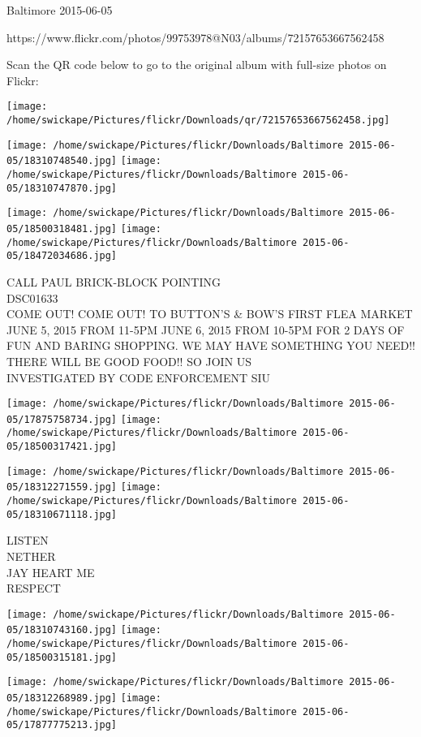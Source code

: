 \documentclass[10pt,letterpaper]{article}
\begin{document}
Baltimore 2015-06-05

https://www.flickr.com/photos/99753978@N03/albums/72157653667562458

Scan the QR code below to go to the original album with full-size photos on Flickr:

\texttt{[image: /home/swickape/Pictures/flickr/Downloads/qr/72157653667562458.jpg]}
\pagebreak

\texttt{[image: /home/swickape/Pictures/flickr/Downloads/Baltimore 2015-06-05/18310748540.jpg]}
\texttt{[image: /home/swickape/Pictures/flickr/Downloads/Baltimore 2015-06-05/18310747870.jpg]}

\texttt{[image: /home/swickape/Pictures/flickr/Downloads/Baltimore 2015-06-05/18500318481.jpg]}
\texttt{[image: /home/swickape/Pictures/flickr/Downloads/Baltimore 2015-06-05/18472034686.jpg]}

CALL PAUL BRICK{-}BLOCK POINTING\\
DSC01633\\
COME OUT!  COME OUT!  TO BUTTON'S \& BOW'S FIRST FLEA MARKET JUNE 5, 2015 FROM 11{-}5PM JUNE 6, 2015 FROM 10{-}5PM FOR 2 DAYS OF FUN AND BARING SHOPPING.  WE MAY HAVE SOMETHING YOU NEED!! THERE WILL BE GOOD FOOD!! SO JOIN US\\
INVESTIGATED BY CODE ENFORCEMENT SIU
\pagebreak

\texttt{[image: /home/swickape/Pictures/flickr/Downloads/Baltimore 2015-06-05/17875758734.jpg]}
\texttt{[image: /home/swickape/Pictures/flickr/Downloads/Baltimore 2015-06-05/18500317421.jpg]}

\texttt{[image: /home/swickape/Pictures/flickr/Downloads/Baltimore 2015-06-05/18312271559.jpg]}
\texttt{[image: /home/swickape/Pictures/flickr/Downloads/Baltimore 2015-06-05/18310671118.jpg]}

LISTEN\\
NETHER\\
JAY HEART ME\\
RESPECT
\pagebreak

\texttt{[image: /home/swickape/Pictures/flickr/Downloads/Baltimore 2015-06-05/18310743160.jpg]}
\texttt{[image: /home/swickape/Pictures/flickr/Downloads/Baltimore 2015-06-05/18500315181.jpg]}

\texttt{[image: /home/swickape/Pictures/flickr/Downloads/Baltimore 2015-06-05/18312268989.jpg]}
\texttt{[image: /home/swickape/Pictures/flickr/Downloads/Baltimore 2015-06-05/17877775213.jpg]}
\end{document}

